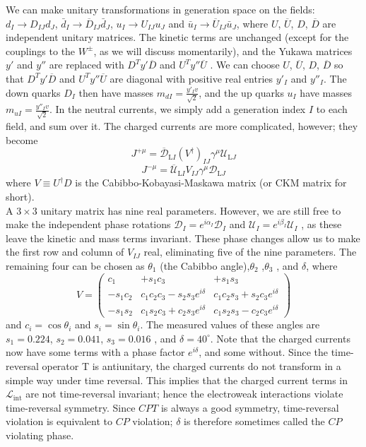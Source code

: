 We can make unitary transformations in generation space on the fields: $d_I \to D_{IJ}d_J $, $\bar{d}_I \to \overline{D}_{IJ}\bar{d}_J$, $u_I \to U_{IJ}u_J $ and $\bar{u}_I \to \overline{U}_{IJ}\bar{u}_J$, where $U$, $\overline{U}$, $D$, $\overline{D}$ are independent unitary matrices. 
The kinetic terms are unchanged (except for the couplings to the $W^{\pm}$, as we will discuss momentarily), and the Yukawa matrices $y'$ and $y''$ are replaced with $D^T y' \overline{D}$  and $U^T y'' \overline{U}$ . We can choose
$U$, $\overline{U}$, $D$, $\overline{D}$ so that $D^T y' \overline{D}$  and $U^T y'' \overline{U}$ are diagonal with positive real entries $y'_I$ and $y''_I$. The down quarks $D_I$ then have masses $m_{dI} = \frac{y'_I v}{\sqrt{2}}$,
and the up quarks $u_I$ have masses $m_{uI} = \frac{y''_I v}{\sqrt{2}}$. In the neutral currents, we simply add a generation index $I$ to each field, and sum over it. 
The charged currents are more complicated, however; they become 
\[J^{+\mu} = \overline{\mathcal{D}}_{\mathrm{L}I} (V^{\dagger})_{IJ} \gamma^{\mu} \mathcal{U}_{\mathrm{L}J}\]
\[J^{-\mu} = \overline{\mathcal{U}}_{\mathrm{L}I} V_{IJ} \gamma^{\mu} \mathcal{D}_{\mathrm{L}J}\]
where $V \equiv U^{\dagger} D$ is the Cabibbo-Kobayasi-Maskawa matrix (or CKM matrix for short).
\\
A $3 \times 3$ unitary matrix has nine real parameters. However, we are still free to make the independent phase rotations $\mathcal{D}_I = e^{i\alpha_I} \mathcal{D}_I$ and $\mathcal{U}_I = e^{i\beta_I} \mathcal{U}_I$ , as
these leave the kinetic and mass terms invariant. These phase changes allow us to make the first row and column of $V_{IJ}$ real, eliminating five of the nine parameters. The remaining four can be chosen as $\theta_1$ (the Cabibbo angle),$\theta_2$ ,$\theta_3$ , and $\delta$, where
\[V = \begin{pmatrix}
c_1 & +s_1c_3 & +s_1s_3 \\
-s_1c_2 & c_1c_2c_3 - s_2s_3e^{i\delta} & c_1c_2s_3 + s_2c_3e^{i\delta} \\
-s_1s_2 & c_1s_2c_3 + c_2s_3e^{i\delta} & c_1s_2s_3- c_2c_3 e^{i\delta}
\end{pmatrix} \]
and $c_i = \cos\theta_i$ and $s_i = \sin\theta_i$. The measured values of these angles are $s_1=0.224$, $s_2 = 0.041$, $s_3 = 0.016$ , and $\delta = 40^{\circ}$. Note that the charged currents now have some terms with a phase factor $e^{i\delta}$, and some without. 
Since the time-reversal operator T is antiunitary, the charged currents do not transform in a simple way under time reversal. This implies that the charged current terms in $\mathcal{L}_{\mathrm{int}}$ are not time-reversal invariant; hence the electroweak interactions violate time-reversal symmetry.
Since $CPT$ is always a good symmetry, time-reversal violation is equivalent to $CP$ violation; $\delta$ is therefore sometimes called the $CP$ violating phase.
